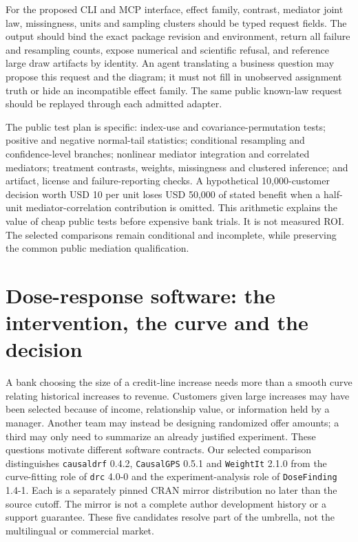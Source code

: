 For the proposed CLI and MCP interface, effect family, contrast, mediator joint
law, missingness, units and sampling clusters should be typed request fields.
The output should bind the exact package revision and environment, return all
failure and resampling counts, expose numerical and scientific refusal, and
reference large draw artifacts by identity. An agent translating a business
question may propose this request and the diagram; it must not fill in
unobserved assignment truth or hide an incompatible effect family. The same
public known-law request should be replayed through each admitted adapter.

The public test plan is specific: index-use and covariance-permutation tests;
positive and negative normal-tail statistics; conditional resampling and
confidence-level branches; nonlinear mediator integration and correlated
mediators; treatment contrasts, weights, missingness and clustered inference;
and artifact, license and failure-reporting checks. A hypothetical 10,000-customer
decision worth USD 10 per unit loses USD 50,000 of stated benefit when a
half-unit mediator-correlation contribution is omitted. This arithmetic explains
the value of cheap public tests before expensive bank trials. It is not measured
ROI. The selected comparisons remain conditional and incomplete, while
preserving the common public mediation qualification.~\citep{exec25_omed_choice}


\section{Dose-response software: the intervention, the curve and the decision}
\label{sec:exec24-dose-response-reuse}

A bank choosing the size of a credit-line increase needs more than a smooth
curve relating historical increases to revenue. Customers given large increases
may have been selected because of income, relationship value, or information
held by a manager. Another team may instead be designing randomized offer
amounts; a third may only need to summarize an already justified experiment.
These questions motivate different software contracts. Our selected comparison
distinguishes \texttt{causaldrf} 0.4.2, \texttt{CausalGPS} 0.5.1 and
\texttt{WeightIt} 2.1.0 from the curve-fitting role of \texttt{drc} 4.0-0 and
the experiment-analysis role of \texttt{DoseFinding} 1.4-1. Each is a separately
pinned CRAN mirror distribution no later than the source cutoff. The mirror is
not a complete author development history or a support guarantee. These five
candidates resolve part of the umbrella, not the multilingual or commercial
market.~\citep{exec24_dose_causaldrf,exec24_dose_causalgps,exec24_dose_weightit,exec24_dose_drc,exec24_dose_dosefinding}

